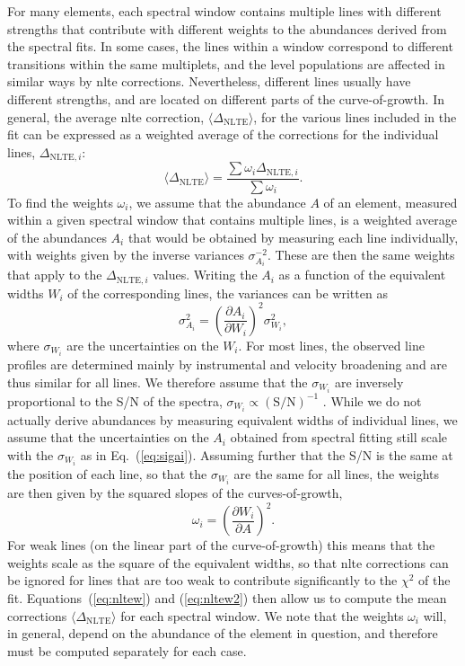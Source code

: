 \documentclass{aa}
\begin{document}
For many elements, each spectral window contains multiple lines with different strengths that  contribute with different weights to the abundances derived from the spectral fits. In some cases, the lines within a window correspond to different transitions within the same multiplets, and the level populations are affected in similar ways by \ac{nlte} corrections. Nevertheless, different lines usually have different strengths, and are located on different parts of the curve-of-growth. In general, the average \ac{nlte} correction, $\langle\Delta_\mathrm{NLTE}\rangle$, for the various lines included in the fit can be expressed as a weighted average of the corrections for the individual lines, $\Delta_{\mathrm{NLTE},i}$:
%
\begin{equation}
    \langle\Delta_\mathrm{NLTE}\rangle = \frac{\sum \omega_i \Delta_{\mathrm{NLTE},i}}{\sum \omega_i}.
    \label{eq:nltew}
\end{equation}
%
To find the weights $\omega_i$, we assume that the abundance $A$ of an element, measured within a given spectral window that contains multiple lines, is a weighted average of the abundances $A_i$ that would be obtained by measuring each line individually, with weights given by the inverse variances $\sigma_{A_i}^{-2}$. These are then the same weights that apply to the $\Delta_{\mathrm{NLTE},i}$ values. 
Writing the $A_i$ as a function of the equivalent widths $W_i$ of the corresponding lines, the variances can be written as
%
\begin{equation}
    \sigma_{A_i}^2 = \left(\frac{\partial A_i}{\partial W_i}\right)^2 \sigma_{W_i}^2,
    \label{eq:sigai}
\end{equation}
%
where $\sigma_{W_i}$ are the uncertainties on the $W_i$. For most lines, the observed line profiles are determined mainly by instrumental and velocity broadening and are thus similar for all lines. We therefore assume that the $\sigma_{W_i}$ are inversely proportional to the S/N of the spectra, $\sigma_{W_i} \propto (\mathrm{S/N})^{-1}$ \citep{Cayrel1988}. 
While we do not actually derive abundances by measuring equivalent widths of individual lines, we assume that the uncertainties on the $A_i$ obtained from spectral fitting still scale with the $\sigma_{W_i}$ as in Eq.~(\ref{eq:sigai}). Assuming further that the S/N is the same at the position of each line, so that the $\sigma_{W_i}$ are the same for all lines, the weights are then given by the squared slopes of the curves-of-growth,
%
\begin{equation}
 \omega_i = \left( \frac{\partial W_i}{\partial A} \right)^2.
 \label{eq:nltew2}
\end{equation}
%
For weak lines (on the linear part of the curve-of-growth) this means that the weights scale as the square of the equivalent widths, so that \ac{nlte} corrections can be ignored for lines that are too weak to contribute significantly to the $\chi^2$ of the fit.
Equations~(\ref{eq:nltew}) and (\ref{eq:nltew2}) then allow us to compute the mean corrections $\langle\Delta_\mathrm{NLTE}\rangle$ for each spectral window. We note that the weights $\omega_i$ will, in general, depend on the abundance of the element in question, and therefore must be computed separately for each case.
\end{document}
